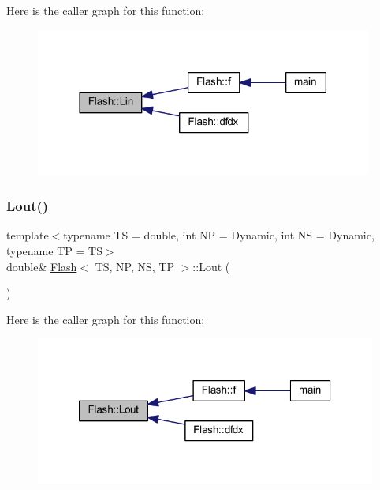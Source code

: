 Here is the caller graph for this function\+:
\nopagebreak
\begin{figure}[H]
\begin{center}
\leavevmode
\includegraphics[width=314pt]{class_flash_a8bfde1e00ab93b6a9b07deead0d3525a_icgraph}
\end{center}
\end{figure}
\mbox{\label{class_flash_a74418fb8dbfaf3f5e8f99d53393f6419}} 
\subsubsection{\texorpdfstring{Lout()}{Lout()}}
{\footnotesize\ttfamily template$<$typename TS = double, int NP = Dynamic, int NS = Dynamic, typename TP = TS$>$ \\
double\& \mbox{\hyperlink{class_flash}{Flash}}$<$ TS, NP, NS, TP $>$\+::Lout (\begin{DoxyParamCaption}{ }\end{DoxyParamCaption})\hspace{0.3cm}{\ttfamily [inline]}}

Here is the caller graph for this function\+:
\nopagebreak
\begin{figure}[H]
\begin{center}
\leavevmode
\includegraphics[width=320pt]{class_flash_a74418fb8dbfaf3f5e8f99d53393f6419_icgraph}
\end{center}
\end{figure}
\mbox{\label{class_flash_ac3cec3cdb03bd71e7b32d7e77a209308}} 
